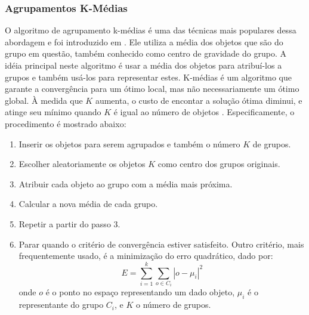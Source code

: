 \subsubsection{Agrupamentos K-Médias}
O algoritmo de agrupamento k-médias é uma das técnicas mais populares dessa abordagem e foi introduzido em \cite{Macqueen67}. Ele utiliza a média dos objetos que são do grupo em questão, também conhecido como centro de gravidade do grupo.  A idéia principal neste algoritmo é usar a média dos objetos para atribuí-los a grupos e também usá-los para  representar estes.
K-médias é um algoritmo que garante a convergência para um ótimo local, mas não necessariamente um ótimo global. À medida que ${K}$ aumenta, o custo de encontar a solução ótima diminui, e atinge seu mínimo quando ${K}$ é igual ao número de objetos \cite{Wu2008}. Especificamente, o procedimento é mostrado abaixo:
 \begin{enumerate}
	\item Inserir os objetos para serem agrupados e também o número ${K}$ de grupos.
	\item Escolher aleatoriamente os objetos ${K}$ como centro dos grupos originais.
	\item Atribuir cada objeto ao grupo com a média mais próxima.
	\item Calcular a nova média de cada grupo.
	\item Repetir a partir do passo 3.
	\item Parar quando o critério de convergência estiver satisfeito. Outro critério, mais frequentemente usado, é a minimização do erro quadrático, dado por: 
	\begin{equation}
	E = \sum_{i=1}^{k}\sum_{o\in C_{i}} |o - \mu_{i}|^{2}
	\end{equation}
	onde ${o}$ é o ponto no espaço representando um dado objeto, ${\mu_{i}}$ é o representante do grupo ${C_{i}}$,
	 e ${K}$ o número de grupos.
\end{enumerate}

